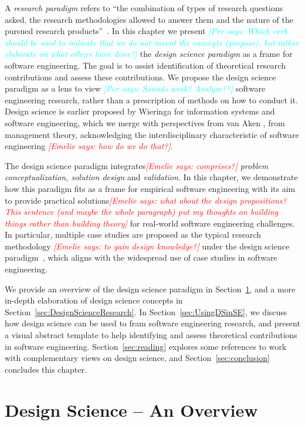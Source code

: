 \documentclass[graybox]{svmult}
\newcommand{\emelie}[1]{\textcolor{red}{{\it [Emelie says: #1]}}}
\newcommand{\per}[1]{\textcolor{cyan}{{\it [Per says: #1]}}}
\newcommand{\emelie}[1]{}
\newcommand{\per}[1]{}
\begin{document}
A \emph{research paradigm} refers to ``the combination of types of research questions asked, the research methodologies allowed to answer them and the nature of the pursued research products''~\cite{van_aken_management_2004}. In this chapter we present \per{Which verb should be used to indicate that we do not invent the concepts (propose), but rather elaborate on what others have done?} the \emph{design science paradigm} as a frame for software engineering. The goal is to assist identification of theoretical research contributions and assess these contributions. We propose the design science paradigm as a lens to view \per{Sounds weak? Analyze??} software engineering research, rather than a prescription of methods on how to conduct it. 
Design science is earlier proposed by Wieringa \cite{wieringa_what_2014} for information systems and software engineering, which we merge with perspectives from van Aken \cite{van_aken_management_2004}, from management theory, acknowledging the interdisciplinary characteristic of software engineering \cite{Mendez2019} \emelie{how do we do that?}.

The design science paradigm integrates\emelie{comprises?} \emph{problem conceptualization, solution design} and \emph{validation}. In this chapter, we demonstrate how this paradigm fits as a frame for empirical software engineering with its aim to provide practical solutions\emelie{what about the design propositions? This sentence (and maybe the whole paragraph) put my thoughts on building things rather than building theory} for real-world software engineering challenges. In particular, multiple case studies are proposed as the typical research methodology \emelie{to gain design knowledge?} under the design science paradigm~\cite{van_aken_management_2004}, which aligns with the widespread use of case studies in software engineering. 

We provide an overview of the design science paradigm in Section~\ref{sec:overview}, and a more in-depth elaboration of design science concepts in Section~\ref{sec:DesignScienceResearch}. In Section~\ref{sec:UsingDSinSE}, we discuss how  design science can be used to fram software engineering research, and present a visual abstract template to help identifying and assess theoretical contributions in software engineering. Section~\ref{sec:reading} explores some references to work with complementary views on design science, and Section~\ref{sec:conclusion} concludes this chapter.


\section{Design Science -- An Overview}
\label{sec:overview}
\end{document}

